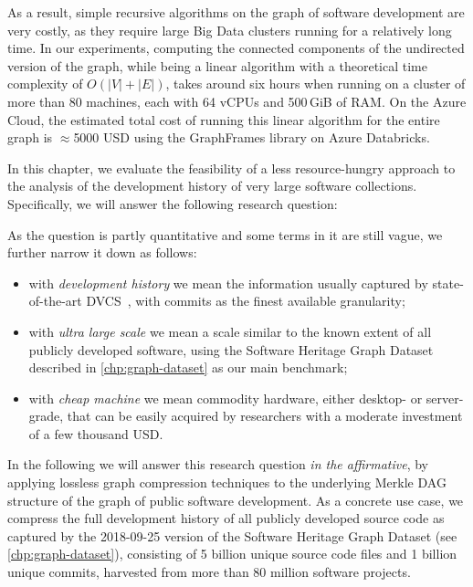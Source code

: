 As a result, simple recursive algorithms on the graph of software development
are very costly, as they require large Big Data clusters running for a
relatively long time. In our experiments, computing the connected components of
the undirected version of the graph, while being a linear algorithm with a
theoretical time complexity of $O(|V| + |E|)$, takes around six hours when
running on a cluster of more than 80 machines, each with 64 vCPUs and 500\,GiB
of RAM\@. On the Azure Cloud, the estimated total cost of running this linear
algorithm for the entire graph is $\approx$5000 USD using the GraphFrames
library on Azure Databricks.

In this chapter, we evaluate the feasibility of a less resource-hungry approach
to the analysis of the development history of very large software collections.
Specifically, we will answer the following research question:

\vspace{1em}

\noindent{}

\vspace{1em}

As the question is partly quantitative and some terms in it are still vague, we
further narrow it down as follows:
\begin{itemize}

\item with \emph{development history} we mean the information usually captured
  by state-of-the-art DVCS~\cite{spinellis2005vcs}, with commits as the finest
  available granularity;

\item with \emph{ultra large scale} we mean a scale similar to the known extent
  of all publicly developed software, using the Software Heritage Graph Dataset
  described in \cref{chp:graph-dataset} as our main benchmark;

\item with \emph{cheap machine} we mean commodity hardware, either desktop- or
  server-grade, that can be easily acquired by researchers with a moderate
  investment of a few thousand USD.

\end{itemize}

In the following we will answer this research question \emph{in the
  affirmative}, by applying lossless graph compression techniques to the
underlying Merkle DAG structure of the graph of public software development. As
a concrete use case, we compress the full development history of all publicly
developed source code as captured by the 2018-09-25 version of the Software
Heritage Graph Dataset (see \cref{chp:graph-dataset}), consisting of 5
billion unique source code files and 1 billion unique commits, harvested from
more than 80 million software projects.

